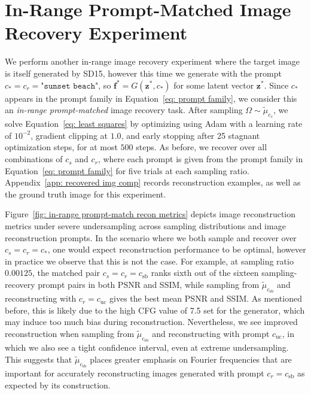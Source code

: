 \documentclass{article}
\theoremstyle{plain}
\theoremstyle{definition}
\theoremstyle{remark}
\begin{document}
\newpage \section{In-Range Prompt-Matched Image Recovery Experiment}\label{app: in range prompt match exp}
We perform another in-range image recovery experiment where the target image is itself generated by SD15, however this time we generate with the prompt $c_* = c_r =  \texttt{"sunset beach"}$, so
$
  \mathbf f^*
  =
  G(\mathbf z^*, c_*)
$
for some latent vector $\mathbf z^*$. Since $c_*$ appears in the prompt family in Equation~\eqref{eq: prompt family}, we consider this an \emph{in-range prompt-matched} image recovery task.  After sampling $\Omega \sim \widetilde{\mu}_{c_s}$, we solve Equation~\eqref{eq: least squares} by optimizing using Adam with a learning rate of $10^{-2}$, gradient clipping at $1.0$,  and early stopping after 25 stagnant optimization steps, for at most $500$ steps. As before, we recover over all combinations of $c_s$ and $c_r$, where each prompt is given from the prompt family in Equation~\eqref{eq: prompt family} for five trials at each sampling ratio. Appendix~\ref{app: recovered img comp} records reconstruction examples, as well as the ground truth image for this experiment.

Figure~\ref{fig: in-range prompt-match recon metrics} depicts image reconstruction metrics under severe undersampling across sampling distributions and image reconstruction prompts. In the scenario where we both sample and recover over $c_s = c_r = c_*$, one would expect reconstruction performance to be optimal, however in practice we observe that this is not the case. For example, at sampling ratio $0.00125$, the matched pair $c_s=c_r=c_\mathrm{sb}$ ranks sixth out of the sixteen sampling-recovery prompt pairs in both PSNR and SSIM, while sampling from $\widetilde\mu_{c_\mathrm{sb}}$ and reconstructing with $c_r=c_\mathrm{uc}$ gives the best mean PSNR and SSIM. As mentioned before, this is likely due to the high CFG value of 7.5 set for the generator, which may induce too much bias during reconstruction. Nevertheless, we see improved reconstruction when sampling from $\widetilde \mu_{c_\mathrm{sb}}$ and reconstructing with prompt $c_{\mathrm{uc}}$, in which we also see a tight confidence interval, even at extreme undersampling. This suggests that $\widetilde \mu_{c_\mathrm{sb}}$ places greater emphasis on Fourier frequencies that are important for accurately reconstructing images generated with prompt $c_r = c_\mathrm{sb}$ as expected by its construction.
\end{document}
